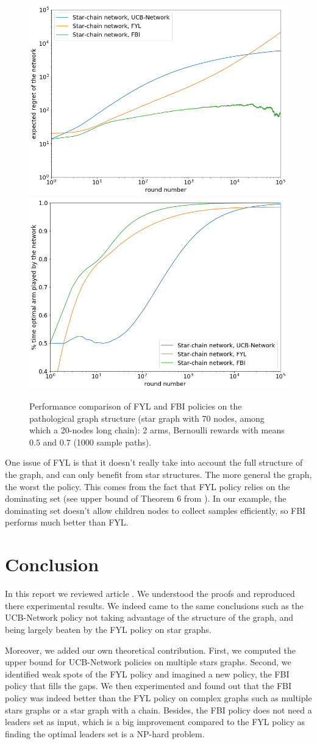 \documentclass{article}
\begin{document}
\begin{figure}[H]
  \centering
  \includegraphics[width=0.49\linewidth]{fig5_1.png}
  \includegraphics[width=0.49\linewidth]{fig5_2.png}
  \caption{Performance comparison of FYL and FBI policies on the pathological graph structure (star graph with 70 nodes, among which a 20-nodes long chain): 2 arms, Bernoulli rewards with means $0.5$ and $0.7$ (1000 sample paths).}
\end{figure}

One issue of FYL is that it doesn't really take into account the full structure of the graph, and can only benefit from star structures. The more general the graph, the worst the policy. This comes from the fact that FYL policy relies on the dominating set (see upper bound of Theorem 6 from \cite{DBLP:journals/corr/KollaJG16}). In our example, the dominating set doesn't allow children nodes to collect samples efficiently, so FBI performs much better than FYL.

\section{Conclusion}

In this report we reviewed article \cite{DBLP:journals/corr/KollaJG16}. We understood the proofs and reproduced there experimental results. We indeed came to the same conclusions such as the UCB-Network policy not taking advantage of the structure of the graph, and being largely beaten by the FYL policy on star graphs.

Moreover, we added our own theoretical contribution. First, we computed the upper bound for UCB-Network policies on multiple stars graphs. Second, we identified weak spots of the FYL policy and imagined a new policy, the FBI policy that fills the gaps. We then experimented and found  out that the FBI policy was indeed better than the FYL policy on complex graphs such as multiple stars graphs or a star graph with a chain. Besides, the FBI policy does not need a leaders set as input, which is a big improvement compared to the FYL policy as finding the optimal leaders set is a NP-hard problem.

{\small


}
\end{document}
